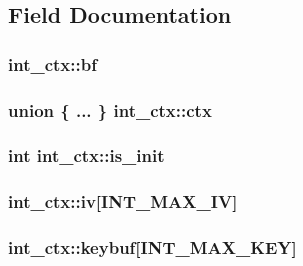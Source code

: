 \subsection{Field Documentation}
\hypertarget{structint__ctx_aac34653068b3f2179215d2d5cd2ace10}{
\subsubsection[{bf}]{ int\-\_\-ctx\-::bf}}\label{structint__ctx_aac34653068b3f2179215d2d5cd2ace10}
\hypertarget{structint__ctx_a752ea1cbe27058721c7f31696dd440f2}{
\subsubsection[{ctx}]{\setlength{\rightskip}{0pt plus 5cm}union \{ ... \} 			 int\-\_\-ctx\-::ctx}}\label{structint__ctx_a752ea1cbe27058721c7f31696dd440f2}
\hypertarget{structint__ctx_a1ec0a9b4938c69f8c3dda43f2df27367}{
\subsubsection[{is\-\_\-init}]{\setlength{\rightskip}{0pt plus 5cm}int int\-\_\-ctx\-::is\-\_\-init}}\label{structint__ctx_a1ec0a9b4938c69f8c3dda43f2df27367}
\hypertarget{structint__ctx_ae931dacd2536e5b4ef71871e351cc6da}{
\subsubsection[{iv}]{ int\-\_\-ctx\-::iv\mbox{[}{\bf I\-N\-T\-\_\-\-M\-A\-X\-\_\-\-I\-V}\mbox{]}}}\label{structint__ctx_ae931dacd2536e5b4ef71871e351cc6da}
\hypertarget{structint__ctx_a896ecf3eb20dd99e750c356fc44825e2}{
\subsubsection[{keybuf}]{ int\-\_\-ctx\-::keybuf\mbox{[}{\bf I\-N\-T\-\_\-\-M\-A\-X\-\_\-\-K\-E\-Y}\mbox{]}}}\label{structint__ctx_a896ecf3eb20dd99e750c356fc44825e2}
